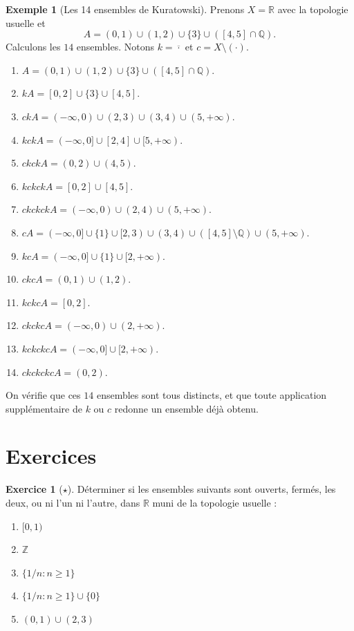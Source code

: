 \documentclass[12pt,a4paper,openany]{book}
\theoremstyle{definition}
\theoremstyle{cours}
\theoremstyle{coursnormal}
\newtheorem{exemple}[theoreme]{Exemple}
\newtheorem{exercice}{Exercice}[chapter]
\newcommand{\Z}{\mathbb{Z}}
\newcommand{\Q}{\mathbb{Q}}
\newcommand{\R}{\mathbb{R}}
\newcommand{\Cl}[1]{\overline{#1}}
\begin{document}
\begin{exemple}[Les 14 ensembles de Kuratowski]\label{ex:kuratowski-14-explicite}
  Prenons $X = \R$ avec la topologie usuelle et
  \[
    A = (0,1) \cup (1,2) \cup \{3\} \cup ([4,5] \cap \Q).
  \]
  Calculons les $14$ ensembles. Notons $k = \Cl{\cdot}$ et $c = X \setminus (\cdot)$.

  \begin{enumerate}
    \item $A = (0,1) \cup (1,2) \cup \{3\} \cup ([4,5] \cap \Q)$.
    \item $kA = [0,2] \cup \{3\} \cup [4,5]$.
    \item $ckA = (-\infty,0) \cup (2,3) \cup (3,4) \cup (5,+\infty)$.
    \item $kckA = (-\infty,0] \cup [2,4] \cup [5,+\infty)$.
    \item $ckckA = (0,2) \cup (4,5)$.
    \item $kckckA = [0,2] \cup [4,5]$.
    \item $ckckckA = (-\infty,0) \cup (2,4) \cup (5,+\infty)$.
    \item $cA = (-\infty,0] \cup \{1\} \cup [2,3) \cup (3,4) \cup ([4,5] \setminus \Q) \cup (5,+\infty)$.
    \item $kcA = (-\infty,0] \cup \{1\} \cup [2,+\infty)$.
    \item $ckcA = (0,1) \cup (1,2)$.
    \item $kckcA = [0,2]$.
    \item $ckckcA = (-\infty,0) \cup (2,+\infty)$.
    \item $kckckcA = (-\infty,0] \cup [2,+\infty)$.
    \item $ckckckcA = (0,2)$.
  \end{enumerate}
  On vérifie que ces $14$ ensembles sont tous distincts, et que toute application supplémentaire de $k$ ou $c$ redonne un ensemble déjà obtenu.
\end{exemple}

\section{Exercices}
\label{sec:exercices-chap2}

\begin{exercice}[$\star$]\label{exo:fermes-usuelle}
  Déterminer si les ensembles suivants sont ouverts, fermés, les deux, ou ni l'un ni l'autre, dans $\R$ muni de la topologie usuelle :
  \begin{enumerate}[label=(\alph*)]
    \item $[0,1)$
    \item $\Z$
    \item $\{1/n : n \geq 1\}$
    \item $\{1/n : n \geq 1\} \cup \{0\}$
    \item $(0,1) \cup (2,3)$
  \end{enumerate}
\end{exercice}
\end{document}
